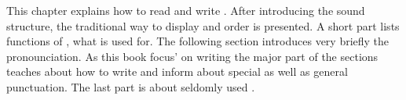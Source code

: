 
%
%

This chapter explains how to read and write \jkanavoc. After introducing the
sound structure, the traditional way to display and order \jtopic is
presented. A short part lists functions of \jtopic, what \jtopic
is used for. The following section introduces very briefly the pronounciation.
As this book focus' on writing the major part of the sections teaches
about how to write \jtopic and inform about special \jtopic as well as general
punctuation. The last part is about seldomly used \jtopic.


